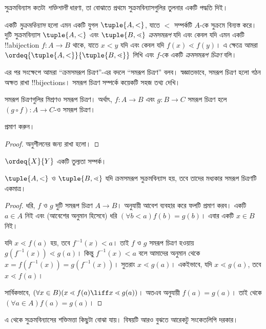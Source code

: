 \documentclass[../../../include/open-logic-section]{subfiles}
\begin{document}

সুক্রমবিন্যাস কতটা \emph{শক্তিশালী} ধারণা, তা
বোঝাতে প্রথমে সুক্রমবিন্যাসগুলির তুলনার একটি
পদ্ধতি দিই।

\begin{defn}
একটি \emph{সুক্রমবিন্যাস} হলো এমন একটি যুগল
$\tuple{A, <}$, যাতে $<$ সম্পর্কটি $A$-কে সুক্রমে
বিন্যস্ত করে। দুটি সুক্রমবিন্যাস $\tuple{A, <}$ এবং
$\tuple{B, \lessdot}$ \emph{ক্রমসমরূপ} {যদি এবং কেবল যদি}
এমন একটি !!a{bijection} $f \colon A \to B$ থাকে, যাতে
$x < y$ যদি এবং কেবল যদি $f(x) \lessdot  f(y)$।
এ ক্ষেত্রে আমরা $\ordeq{\tuple{A, <}}{\tuple{B, \lessdot}}$
লিখি এবং $f$-কে একটি \emph{ক্রমসমরূপ চিত্রণ} বলি।
\end{defn}
\noindent
এর পর সংক্ষেপে আমরা ``ক্রমসমরূপ চিত্রণ''-এর বদলে
``সমরূপ চিত্রণ'' বলব। স্বজ্ঞাতভাবে, সমরূপ চিত্রণ হলো
গঠন অক্ষত রাখা !!{bijection}s। সমরূপ চিত্রণ সম্পর্কে
কয়েকটি সহজ তথ্য দেখি।

\begin{lem}
সমরূপ চিত্রণগুলির মিশ্রণও সমরূপ চিত্রণ। অর্থাৎ,
$f \colon A \to B$ এবং $g \colon B \to C$ সমরূপ
চিত্রণ হলে $(g \circ f) \colon A \to C$-ও সমরূপ
চিত্রণ।
\end{lem}
\begin{prob}
	 প্রমাণ করুন।
\end{prob}
\begin{proof}
অনুশীলনের জন্য রাখা হলো।
\end{proof}
\begin{cor}
	$\ordeq{X}{Y}$ একটি তুল্যতা সম্পর্ক।
\end{cor}
\begin{prop}
$\tuple{A, <}$ ও $\tuple{B, \lessdot}$ যদি
ক্রমসমরূপ সুক্রমবিন্যাস হয়, তবে তাদের মধ্যকার
সমরূপ চিত্রণটি একমাত্র।
\end{prop}

\begin{proof}
ধরি, $f$ ও $g$ দুটি সমরূপ চিত্রণ $A \to B$।
 অনুযায়ী আবেশ ব্যবহার
করে ফলটি প্রমাণ করব। একটি $a\in A$ নিই এবং
(আবেশের অনুমান হিসেবে) ধরি
$(\forall b < a)f(b) = g(b)$। এবার একটি $x \in B$ নিই।

যদি $x \lessdot f(a)$ হয়, তবে
$f^{-1}(x) < a$। তাই $f$ ও $g$ সমরূপ চিত্রণ
হওয়ায় $g(f^{-1}(x)) \lessdot g(a)$। কিন্তু
$f^{-1}(x) < a$ বলে আমাদের অনুমান থেকে
$x =f(f^{-1}(x)) = g(f^{-1}(x))$। সুতরাং
$x \lessdot g(a)$। একইভাবে, যদি $x \lessdot g(a)$,
তবে $x \lessdot f(a)$।

সার্বিকভাবে, $(\forall x \in B)(x \lessdot f(a) \liff x \lessdot
g(a))$। অতএব
অনুযায়ী $f(a) = g(a)$। তাই
 থেকে $(\forall
a \in A)f(a) = g(a)$।
\end{proof}\noindent
এ থেকে সুক্রমবিন্যাসের শক্তিমত্তা কিছুটা বোঝা যায়।
বিষয়টি আরও বুঝতে আরেকটু সংকেতলিপি দরকার।
\end{document}
